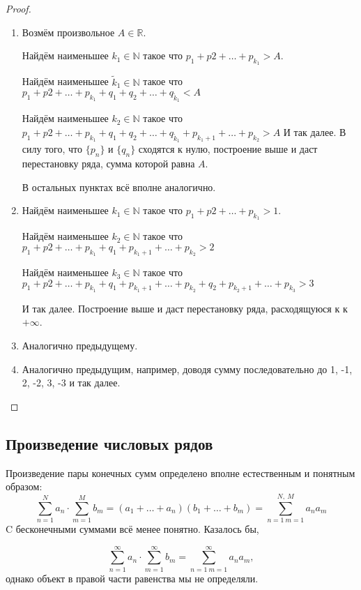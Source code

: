 \documentclass[a4paper, 12pt]{article}
\begin{document}
	\begin{proof} \ 
		\begin{enumerate}
			\item Возмём произвольное $A \in \mathbb{R}$.  
			
			Найдём наименьшее $k_1 \in \mathbb{N}$ такое что $p_1+p2+\dots+p_{k_1} > A$. 
			
			Найдём наименьшее $\tilde{k}_1 \in \mathbb{N}$ такое что $p_1+p2+\dots+p_{k_1} + q_1+q_2 +\dots +q_{\tilde{k}_1} < A$ 
			
			Найдём наименьшее $k_2 \in \mathbb{N}$ такое что $p_1+p2+\dots+p_{k_1} + q_1+q_2 +\dots +q_{\tilde{k}_1}+ p_{k_1+1}+\dots+p_{k_2} > A$ 
			И так далее. В силу того, что $\{p_n\}$ и $\{q_n\}$ сходятся к нулю, построение выше и даст перестановку ряда, сумма которой равна $A$.
			
			В остальных пунктах всё вполне аналогично.
			\item 
			Найдём наименьшее $k_1 \in \mathbb{N}$ такое что $p_1+p2+\dots+p_{k_1} > 1$. 
			
			Найдём наименьшее $k_2 \in \mathbb{N}$ такое что $p_1+p2+\dots+p_{k_1} + q_1+ p_{k_1+1}+\dots+p_{k_2} > 2$ 

			Найдём наименьшее $k_3 \in \mathbb{N}$ такое что $p_1+p2+\dots+p_{k_1} + q_1+ p_{k_1+1}+\dots+p_{k_2} + q_2
			+ p_{k_2+1}+\dots+p_{k_3} > 3$ 

			И так далее. Построение выше и даст перестановку ряда, расходящуюся к к $+\infty$.
			\item Аналогично предыдущему.
			\item Аналогично предыдущим, например, доводя сумму последовательно до 1, -1, 2, -2, 3, -3 и так далее.
		\end{enumerate}
	\end{proof}

\subsection{Произведение числовых рядов}
	Произведение пары конечных сумм определено вполне естественным и понятным образом:
	\[
	\sum\limits_{n=1}^{N}a_n \cdot \sum\limits_{m=1}^{M}b_m = (a_1 + \dots + a_n) (b_1 + \dots + b_m)=\sum\limits_{n=1 \ m=1}^{N,\  M}a_na_m
	\]
	C бесконечными суммами всё менее понятно. Казалось бы,
	
	\[
	\sum\limits_{n=1}^{\infty}a_n \cdot \sum\limits_{m=1}^{\infty}b_m = \sum\limits_{n=1 \ m=1}^{\infty}a_na_m,
	\] однако объект в правой части равенства мы не определяли.
	
\end{document}
